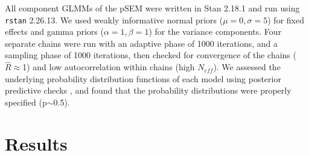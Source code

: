 \documentclass[12pt]{article} %
\begin{document}
All component GLMMs of the pSEM were written in Stan 2.18.1 \citep{gelman2015} and run using \texttt{rstan} 2.26.13.
We used weakly informative normal priors ($\mu=0, \sigma=5$) for fixed effects and gamma priors ($\alpha=1, \beta=1$) for the variance components.
Four separate chains were run with an adaptive phase of 1000 iterations, and a sampling phase of 1000 iterations, then checked for convergence of the chains ($\hat{R} \approx$1) and low autocorrelation within chains (high $N_{eff}$).
We assessed the underlying probability distribution functions of each model using posterior predictive checks \citep{gelman2013}, and found that the probability distributions were properly specified (p$\sim$0.5).

\section{Results}
\end{document}
